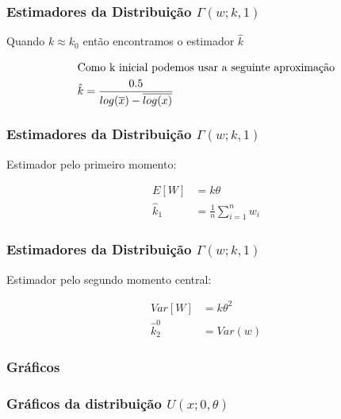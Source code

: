 \begin{frame}
  \frametitle{Estimadores da Distribuição $\Gamma(w;k,1)$}
  Quando $k \approx k_0$ então encontramos o estimador $\hat{k}$  

  \small \begin{align}
    \intertext{Como k inicial podemos usar a seguinte aproximação}
    \hat{k} &= \frac{0.5}{log(\overline{x}) - \overline{log(x)}}
  \end{align}
\end{frame}

\begin{frame}
  \frametitle{Estimadores da Distribuição $\Gamma(w;k,1)$}
  
  Estimador pelo primeiro momento:
  
    \begin{align}
      E[W] &= k\theta \\
      \hat{k}_1 &= \frac{1}{n} \sum_{i=1}^nw_i 
    \end{align}
\end{frame}

\begin{frame}
  \frametitle{Estimadores da Distribuição $\Gamma(w;k,1)$}
  
  Estimador pelo segundo momento central:
  
    \begin{align}
      Var[W] &= k\theta^2 \\
      \hat{k}_2^0 &= Var(w)  
    \end{align}
\end{frame}


\subsubsection{Gráficos}
\begin{frame}
\frametitle{Gráficos da distribuição $U(x; 0,\theta)$}

\end{frame}



